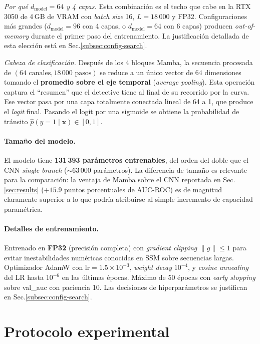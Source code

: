 \documentclass[11pt,a4paper]{article}
\begin{document}
\emph{Por qué $d_{\text{model}} = 64$ y 4 capas.}
Esta combinación es el techo que cabe en la RTX 3050 de 4\,GB de
VRAM con \textit{batch size} 16, $L = 18\,000$ y FP32.
Configuraciones más grandes ($d_{\text{model}} = 96$ con 4 capas, o
$d_{\text{model}} = 64$ con 6 capas) producen \textit{out-of-memory}
durante el primer paso del entrenamiento. La justificación detallada
de esta elección está en Sec.\ref{subsec:config-search}.

\emph{Cabeza de clasificación.}
Después de los 4 bloques Mamba, la secuencia procesada de
$(64 \text{ canales}, 18\,000 \text{ pasos})$ se reduce a un único
vector de 64 dimensiones tomando el \textbf{promedio sobre el eje
temporal} (\textit{average pooling}). Esta operación captura el
``resumen'' que el detective tiene al final de su recorrido por la
curva. Ese vector pasa por una capa totalmente conectada lineal de
64 a 1, que produce el \textit{logit} final. Pasando el logit por
una sigmoide se obtiene la probabilidad de tránsito
$\hat{p}(y = 1 \mid \mathbf{x}) \in [0, 1]$.

\paragraph{Tamaño del modelo.}
El modelo tiene \textbf{131\,393 parámetros entrenables}, del orden
del doble que el CNN \textit{single-branch} ($\sim 63\,000$
parámetros). La diferencia de tamaño es relevante para la
comparación: la ventaja de Mamba sobre el CNN reportada en
Sec.\ref{sec:results} ($+15.9$ puntos porcentuales de AUC-ROC) es
de magnitud claramente superior a lo que podría atribuirse al
simple incremento de capacidad paramétrica.

\paragraph{Detalles de entrenamiento.}
Entrenado en \textbf{FP32} (precisión completa) con
\textit{gradient clipping} $\|g\| \leq 1$ para evitar inestabilidades
numéricas conocidas en SSM sobre secuencias largas. Optimizador
AdamW con $\text{lr} = 1.5\!\times\!10^{-3}$, \textit{weight decay}
$10^{-4}$, y \textit{cosine annealing} del LR hasta $10^{-6}$ en
las últimas épocas. Máximo de 50 épocas con \textit{early stopping}
sobre val\_auc con paciencia 10. Las decisiones de hiperparámetros
se justifican en Sec.\ref{subsec:config-search}.

\section{Protocolo experimental}
\label{sec:protocol}
\end{document}
